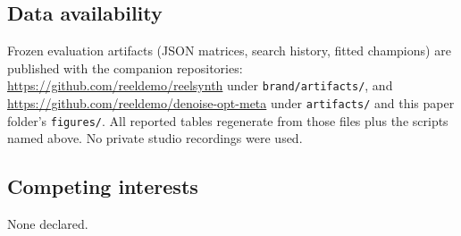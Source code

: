 \subsection{Data availability}
\label{sec:data-availability}
Frozen evaluation artifacts (JSON matrices, search history, fitted champions) are published with the companion repositories:
\url{https://github.com/reeldemo/reelsynth} under \texttt{brand/artifacts/}, and
\url{https://github.com/reeldemo/denoise-opt-meta} under \texttt{artifacts/} and this paper folder's \texttt{figures/}.
All reported tables regenerate from those files plus the scripts named above.
No private studio recordings were used.

\subsection{Competing interests}
\label{sec:competing}
None declared.
